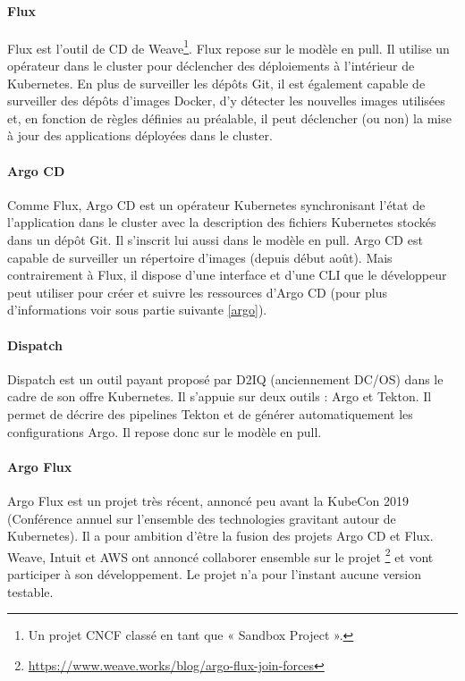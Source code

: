 \documentclass[11pt,fleqn]{book} %
\begin{document}
\paragraph{Flux}
Flux est l’outil de CD de Weave\footnote{Un projet CNCF classé en tant que « Sandbox Project ».}. Flux repose sur le modèle en pull. Il utilise un opérateur dans le cluster pour déclencher des déploiements à l'intérieur de Kubernetes. En plus de surveiller les dépôts Git, il est également capable de surveiller des dépôts d'images Docker, d'y détecter les nouvelles images utilisées et, en fonction de règles définies au préalable, il peut déclencher (ou non) la mise à jour des applications déployées dans le cluster.

\paragraph{Argo CD}
Comme Flux, Argo CD est un opérateur Kubernetes synchronisant l'état de l'application dans le cluster avec la description des fichiers Kubernetes stockés dans un dépôt Git. Il s’inscrit lui aussi dans le modèle en pull. Argo CD est capable de surveiller un répertoire d'images (depuis début août). Mais contrairement à Flux, il dispose d'une interface et d'une CLI que le développeur peut utiliser pour créer et suivre les ressources d’Argo CD (pour plus d'informations voir sous partie suivante \ref{argo}).

\paragraph{Dispatch}
Dispatch est un outil payant proposé par D2IQ (anciennement DC/OS) dans le cadre de son offre Kubernetes. Il s'appuie sur deux outils : Argo et Tekton. Il permet de décrire des pipelines Tekton et de générer automatiquement les configurations Argo. Il repose donc sur le modèle en pull.

\paragraph{Argo Flux}
Argo Flux est un projet très récent, annoncé peu avant la KubeCon 2019 (Conférence annuel sur l'ensemble des technologies gravitant autour de Kubernetes). Il a pour ambition d’être la fusion des projets Argo CD et Flux. Weave, Intuit et AWS ont annoncé collaborer ensemble sur le projet  \footnote{\url{https://www.weave.works/blog/argo-flux-join-forces}} et vont participer à son développement. Le projet n'a pour l'instant aucune version testable.
\end{document}
